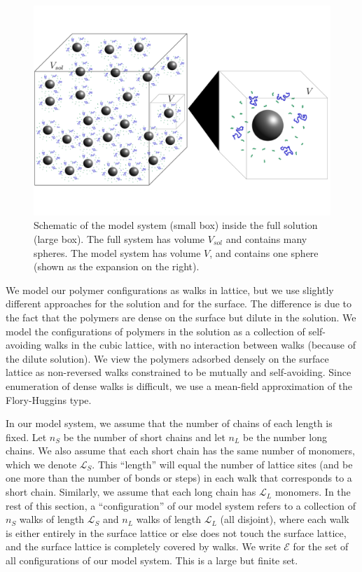 \documentclass[twoside,twocolumn,9pt]{article}
\newcommand{\leng}{\mathcal{L}}
\begin{document}
 \begin{figure}[h] 
  \includegraphics[scale=0.075]{Figure3.pdf}
\caption{Schematic of the model system (small box)
inside the full solution (large box). The full system
has volume $V_{sol}$ and contains many spheres. The model system has volume $V$, and contains one sphere (shown as the expansion on the right).}
\label{figure1volume}
\end{figure}




We model our polymer configurations as walks in lattice, but we use slightly different approaches for the solution and for the surface.
The difference is due to the fact that the polymers are dense on the surface but 
dilute in the solution.  We model the configurations of polymers in the solution as a collection of 
self-avoiding walks in the cubic lattice, with no interaction between walks (because of the dilute solution).
We view the polymers adsorbed densely on the surface lattice as non-reversed walks constrained to
be mutually and self-avoiding.  Since enumeration of
dense walks is difficult, we use a mean-field 
approximation of the Flory-Huggins type.\cite{Flory1953}

In our model system, we assume that the number of chains of each length is fixed.  
Let $n_S$ be the number of short chains
and let $n_L$ be the number long chains.
We also assume that each
short chain has the same number of monomers, 
which we denote $\leng_S$.  This ``length'' 
will equal the number of lattice sites (and be one
more than the number of bonds or steps) in each
walk that corresponds to a short chain.
Similarly, we assume that each long 
chain has $\leng_L$ monomers.
In the rest of this section, a ``configuration''
of our model system refers to a collection of $n_S$
walks of length $\leng_S$ and $n_L$ walks of length
$\leng_L$ (all disjoint), 
where each walk is either entirely in the 
surface lattice or else does not touch the surface
lattice, and the surface lattice is completely 
covered by walks.  
We write $\mathcal{E}$ for the 
set of all configurations of our model system.
This is a large but finite set.
\end{document}
